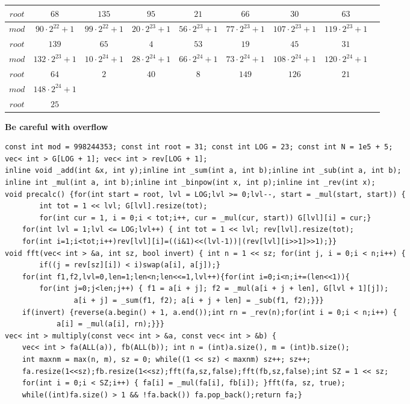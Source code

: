 \documentclass[a4paper,12pt]{article}
\begin{document}
\begin{tabular}{|c|c|c|c|c|c|c|c|c|}
$root$& $68$& $135$& $95$& $21$& $66$& $30$& $63$\\
\hline


$mod$& $90\cdot 2^{22}+1$& $99\cdot 2^{22}+1$& $20\cdot 2^{23}+1$& $56\cdot 2^{23}+1$& $77\cdot 2^{23}+1$& $107\cdot 2^{23}+1$& $119\cdot 2^{23}+1$\\
\hline

$root$& $139$& $65$& $4$& $53$& $19$& $45$& $31$\\
\hline


$mod$& $132\cdot 2^{23}+1$& $10\cdot 2^{24}+1$& $28\cdot 2^{24}+1$& $66\cdot 2^{24}+1$& $73\cdot 2^{24}+1$& $108\cdot 2^{24}+1$& $120\cdot 2^{24}+1$\\
\hline

$root$& $64$& $2$& $40$& $8$& $149$& $126$& $21$\\
\hline


$mod$& $148\cdot 2^{24}+1$\\
\hline

$root$& $25$\\
\hline
\end{tabular}

{\bf Be careful with overflow}

\begin{verbatim}
const int mod = 998244353; const int root = 31; const int LOG = 23; const int N = 1e5 + 5;
vec< int > G[LOG + 1]; vec< int > rev[LOG + 1];
inline void _add(int &x, int y);inline int _sum(int a, int b);inline int _sub(int a, int b);
inline int _mul(int a, int b);inline int _binpow(int x, int p);inline int _rev(int x);
void precalc() {for(int start = root, lvl = LOG;lvl >= 0;lvl--, start = _mul(start, start)) {
        int tot = 1 << lvl; G[lvl].resize(tot);
        for(int cur = 1, i = 0;i < tot;i++, cur = _mul(cur, start)) G[lvl][i] = cur;}
    for(int lvl = 1;lvl <= LOG;lvl++) { int tot = 1 << lvl; rev[lvl].resize(tot);
    for(int i=1;i<tot;i++)rev[lvl][i]=((i&1)<<(lvl-1))|(rev[lvl][i>>1]>>1);}}
void fft(vec< int > &a, int sz, bool invert) { int n = 1 << sz; for(int j, i = 0;i < n;i++) {
        if((j = rev[sz][i]) < i)swap(a[i], a[j]);}
    for(int f1,f2,lvl=0,len=1;len<n;len<<=1,lvl++){for(int i=0;i<n;i+=(len<<1)){
        for(int j=0;j<len;j++) { f1 = a[i + j]; f2 = _mul(a[i + j + len], G[lvl + 1][j]);
                a[i + j] = _sum(f1, f2); a[i + j + len] = _sub(f1, f2);}}}
    if(invert) {reverse(a.begin() + 1, a.end());int rn = _rev(n);for(int i = 0;i < n;i++) {
            a[i] = _mul(a[i], rn);}}}
vec< int > multiply(const vec< int > &a, const vec< int > &b) {
    vec< int > fa(ALL(a)), fb(ALL(b)); int n = (int)a.size(), m = (int)b.size();
    int maxnm = max(n, m), sz = 0; while((1 << sz) < maxnm) sz++; sz++;
    fa.resize(1<<sz);fb.resize(1<<sz);fft(fa,sz,false);fft(fb,sz,false);int SZ = 1 << sz;
    for(int i = 0;i < SZ;i++) { fa[i] = _mul(fa[i], fb[i]); }fft(fa, sz, true);
    while((int)fa.size() > 1 && !fa.back()) fa.pop_back();return fa;}
\end{verbatim}
\end{document}
